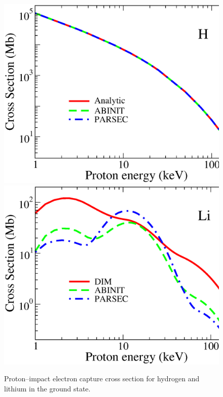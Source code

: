 \documentclass[10pt]{article}
\begin{document}
\begin{figure}[H]
\centering
 \includegraphics[height=0.23\textheight]{figures/pseudopot/captureH.eps}
 \hspace{0.3cm}
 \includegraphics[height=0.23\textheight]{figures/pseudopot/captureLi.eps}
 \caption{Proton--impact electron capture cross section for hydrogen 
 and lithium in the ground state.}
 \label{fig:captureH}
\end{figure}

\end{document}
